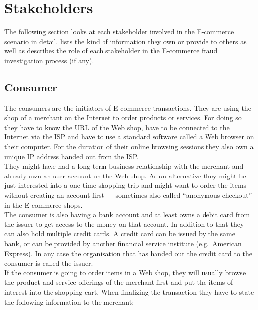 
\section{Stakeholders}
\label{sec:stakeholder_analysis}

The following section looks at each stakeholder involved in the \gls{E-commerce} scenario in detail, lists the kind of information they own or provide to others as well as describes the role of each stakeholder in the \gls{E-commerce} fraud investigation process (if any).

\subsection{Consumer}
\label{subsec:stakeholder_consumer}

The consumers are the initiators of \gls{E-commerce} transactions. They are using the shop of a merchant on the Internet to order products or services. For doing so they have to know the \gls{URL} of the Web shop, have to be connected to the Internet via the \gls{ISP} and have to use a standard software called a Web browser on their computer. For the duration of their online browsing sessions they also own a unique \gls{IP} address handed out from the \gls{ISP}.\\

They might have had a long-term business relationship with the merchant and already own an user account on the Web shop. As an alternative they might be just interested into a one-time shopping trip and might want to order the items without creating an account first --- sometimes also called ``anonymous checkout'' in the \gls{E-commerce} shops. \\

The consumer is also having a bank account and at least owns a debit card from the issuer to get access to the money on that account. In addition to that they can also hold multiple credit cards. A credit card can be issued by the same bank, or can be provided by another financial service institute (e.g.\ American Express). In any case the organization that has handed out the credit card to the consumer is called the issuer. \\

If the consumer is going to order items in a Web shop, they will usually browse the product and service offerings of the merchant first and put the items of interest into the shopping cart. When finalizing the transaction they have to state the following information to the merchant:\@


